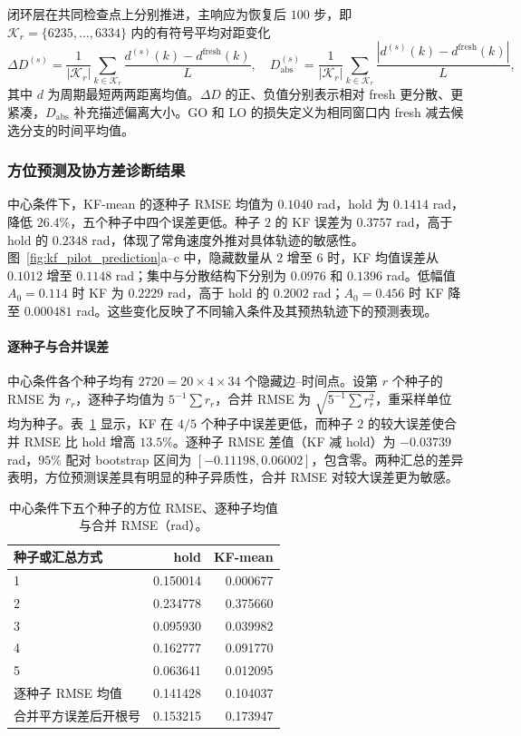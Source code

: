 \documentclass[UTF8,fontset=windows,11pt]{ctexart}
\begin{document}
闭环层在共同检查点上分别推进，主响应为恢复后 $100$ 步，即 $\mathcal K_r=\{6235,\ldots,6334\}$ 内的有符号平均对距变化
\begin{equation}
 \Delta D^{(s)}=\frac{1}{|\mathcal K_r|}\sum_{k\in\mathcal K_r}
 \frac{d^{(s)}(k)-d^{\mathrm{fresh}}(k)}{L},
 \quad
 D_{\mathrm{abs}}^{(s)}=\frac{1}{|\mathcal K_r|}\sum_{k\in\mathcal K_r}
 \frac{|d^{(s)}(k)-d^{\mathrm{fresh}}(k)|}{L},
 \label{eq:pilot_distance_metrics}
\end{equation}
其中 $d$ 为周期最短两两距离均值。$\Delta D$ 的正、负值分别表示相对 fresh 更分散、更紧凑，$D_{\mathrm{abs}}$ 补充描述偏离大小。GO 和 LO 的损失定义为相同窗口内 fresh 减去候选分支的时间平均值。

\subsubsection{方位预测及协方差诊断结果}

中心条件下，KF-mean 的逐种子 RMSE 均值为 $0.1040$ rad，hold 为 $0.1414$ rad，降低 $26.4\%$，五个种子中四个误差更低。种子 $2$ 的 KF 误差为 $0.3757$ rad，高于 hold 的 $0.2348$ rad，体现了常角速度外推对具体轨迹的敏感性。图~\ref{fig:kf_pilot_prediction}a--c 中，隐藏数量从 $2$ 增至 $6$ 时，KF 均值误差从 $0.1012$ 增至 $0.1148$ rad；集中与分散结构下分别为 $0.0976$ 和 $0.1396$ rad。低幅值 $A_0=0.114$ 时 KF 为 $0.2229$ rad，高于 hold 的 $0.2002$ rad；$A_0=0.456$ 时 KF 降至 $0.000481$ rad。这些变化反映了不同输入条件及其预热轨迹下的预测表现。

\paragraph{逐种子与合并误差}
中心条件各个种子均有 $2720=20\times4\times34$ 个隐藏边--时间点。设第 $r$ 个种子的 RMSE 为 $r_r$，逐种子均值为 $5^{-1}\sum r_r$，合并 RMSE 为 $\sqrt{5^{-1}\sum r_r^2}$，重采样单位均为种子。表~\ref{tab:rmse_sensitivity} 显示，KF 在 $4/5$ 个种子中误差更低，而种子 $2$ 的较大误差使合并 RMSE 比 hold 增高 $13.5\%$。逐种子 RMSE 差值（KF 减 hold）为 $-0.03739$ rad，$95\%$ 配对 bootstrap 区间为 $[-0.11198,0.06002]$，包含零。两种汇总的差异表明，方位预测误差具有明显的种子异质性，合并 RMSE 对较大误差更为敏感。

\begin{table}[!tbp]
\centering\small
\caption{中心条件下五个种子的方位 RMSE、逐种子均值与合并 RMSE（rad）。}
\label{tab:rmse_sensitivity}
\begin{tabular}{lrr}
\toprule 种子或汇总方式 & hold & KF-mean\\\midrule
1 & 0.150014 & 0.000677\\
2 & 0.234778 & 0.375660\\
3 & 0.095930 & 0.039982\\
4 & 0.162777 & 0.091770\\
5 & 0.063641 & 0.012095\\\midrule
逐种子 RMSE 均值 & 0.141428 & 0.104037\\
合并平方误差后开根号 & 0.153215 & 0.173947\\\bottomrule
\end{tabular}
\end{table}
\end{document}
